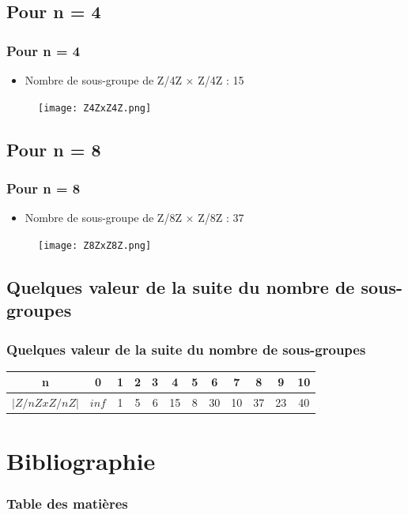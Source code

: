 \documentclass{beamer}
\begin{document}
\subsection{Pour n = 4}
\begin{frame}
\frametitle{Pour n = 4}
\begin{itemize}
    \item Nombre de sous-groupe de Z/4Z × Z/4Z : 15
\end{itemize}
\begin{figure}
  \centering
  \texttt{[image: Z4ZxZ4Z.png]}
\end{figure}
\end{frame}


\subsection{Pour n = 8}
\begin{frame}
\frametitle{Pour n = 8}
\begin{itemize}
    \item Nombre de sous-groupe de Z/8Z × Z/8Z : 37
\end{itemize}
\begin{figure}
  \centering
  \texttt{[image: Z8ZxZ8Z.png]}
\end{figure}
\end{frame}


\subsection{Quelques valeur de la suite du nombre de sous-groupes}
\begin{frame}
\frametitle{Quelques valeur de la suite du nombre de sous-groupes}
\begin{center}
    \begin{tabular}{|c|c|c|c|c|c|c|c|c|c|c|c|}
        \hline
        n       & 0     & 1 & 2 & 3 & 4  & 5 & 6  & 7  & 8  & 9  & 10 \tabularnewline
        \hline
        $| Z/nZxZ/nZ |$ & $inf$ & 1 & 5 & 6 & 15 & 8 & 30 & 10 & 37 & 23 & 40 \tabularnewline
        \hline
    \end{tabular}
\end{center}
\end{frame}


\section{Bibliographie}
\begin{frame}
\frametitle{Table des matières}
\tableofcontents[currentsection]
\end{frame}
\end{document}
